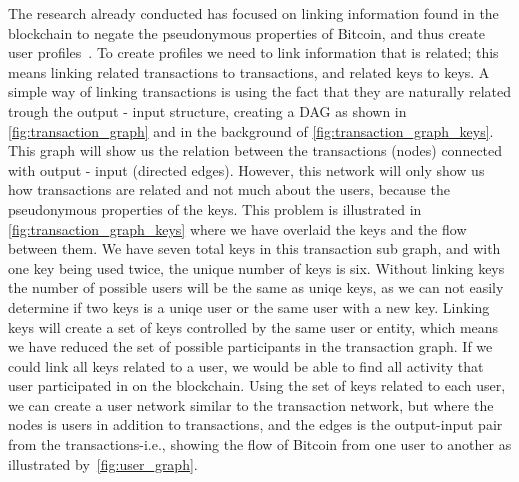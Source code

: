 The research already conducted has focused on linking information found in the blockchain to negate the pseudonymous properties of Bitcoin, and thus create user profiles~\cite{meiklejohn2013fistful,androulaki2013evaluating,reid2013analysis,ron2013quantitative}. To create profiles we need to link information that is related; this means linking related transactions to transactions, and related keys to keys. A simple way of linking transactions is using the fact that they are naturally related trough the output - input structure, creating a DAG as shown in \cref{fig:transaction_graph} and in the background of \cref{fig:transaction_graph_keys}. This graph will show us the relation between the transactions (nodes) connected with output - input (directed edges). However, this network will only show us how transactions are related and not much about the users, because the pseudonymous properties of the keys. This problem is illustrated in \cref{fig:transaction_graph_keys} where we have overlaid the keys and the flow between them. We have seven total keys in this transaction sub graph, and with one key being used twice, the unique number of keys is six. Without linking keys the number of possible users will be the same as uniqe keys, as we can not easily determine if two keys is a uniqe user or the same user with a new key. Linking keys will create a set of keys controlled by the same user or entity, which means we have reduced the set of possible participants in the transaction graph. If we could link all keys related to a user, we would be able to find all activity that user participated in on the blockchain. Using the set of keys related to each user, we can create a user network similar to the transaction network, but where the nodes is users in addition to transactions, and the edges is the output-input pair from the transactions-i.e., showing the flow of Bitcoin from one user to another as illustrated by~\cref{fig:user_graph}. 
